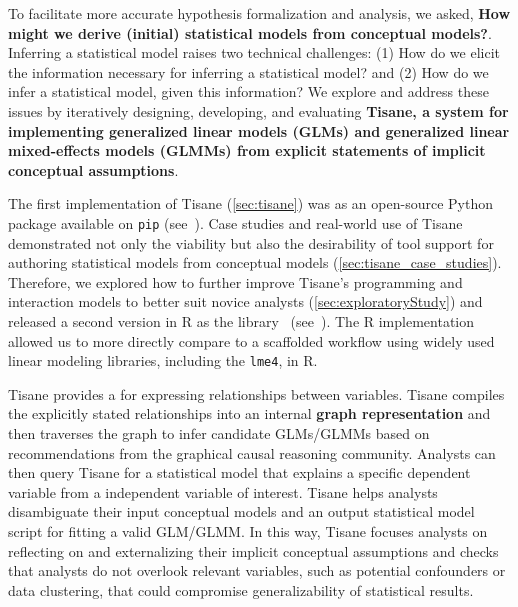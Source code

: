 To facilitate more accurate hypothesis formalization and analysis, we asked,
\textbf{How might we derive (initial) statistical models from conceptual
models?}. Inferring a statistical model raises two technical challenges: (1) How
do we elicit the information necessary for inferring a statistical model? and
(2) How do we infer a statistical model, given this information? We explore and
address these issues by iteratively designing, developing, and evaluating
\textbf{Tisane, a system for implementing generalized linear models (GLMs) and
generalized linear mixed-effects models (GLMMs) from explicit statements of
implicit conceptual assumptions}. 

The first implementation of Tisane (\autoref{sec:tisane}) was as an open-source
Python package available on \texttt{pip} (see~\cite{tisaneWebsite}). Case studies and
real-world use of Tisane demonstrated not only the viability but also
the desirability of tool support for authoring statistical models from
conceptual models (\autoref{sec:tisane_case_studies}). Therefore, we explored how to further improve Tisane's
programming and interaction models to better suit novice analysts
(\autoref{sec:exploratoryStudy}) and released a second version in R as the
\rTisane library~\cite{jun2023rTisane} (see~\cite{tisaneWebsite}). The R implementation allowed us to more
directly compare \rTisane to a scaffolded workflow using widely used linear
modeling libraries, including the \texttt{lme4}, in R. 

Tisane provides a \textbf{\SDSLlong} for expressing %
relationships between variables. Tisane compiles the explicitly stated
relationships into an internal \textbf{graph representation} and then traverses
the graph to infer candidate GLMs/GLMMs based on recommendations from the
graphical causal reasoning community. Analysts can then query Tisane for a
statistical model that explains a specific dependent variable from a independent
variable of interest. Tisane helps analysts disambiguate their input conceptual
models and an output statistical model script for fitting a valid GLM/GLMM. In
this way, Tisane focuses analysts on reflecting on and externalizing their
implicit conceptual assumptions and checks that analysts do not overlook
relevant variables, such as potential confounders or data clustering, that could
compromise generalizability of statistical results. %

